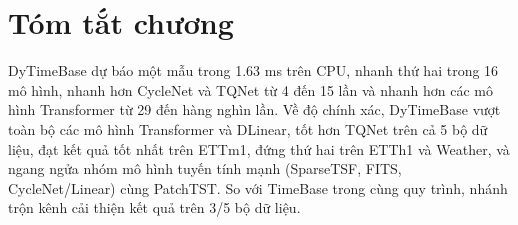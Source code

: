 \documentclass[12pt,a4paper]{report}
\numberwithin{equation}{chapter}
\begin{document}
\section*{Tóm tắt chương}

DyTimeBase dự báo một mẫu trong 1.63 ms trên CPU, nhanh thứ hai trong 16 mô hình, nhanh hơn CycleNet và TQNet từ 4 đến
15 lần và nhanh hơn các mô hình Transformer từ 29 đến hàng nghìn lần. Về độ
chính xác, DyTimeBase vượt toàn bộ các mô hình Transformer và DLinear, tốt hơn TQNet trên cả 5 bộ dữ liệu, đạt kết quả
tốt nhất trên ETTm1, đứng thứ hai trên ETTh1 và Weather, và ngang ngửa nhóm mô hình tuyến tính mạnh (SparseTSF, FITS,
CycleNet/Linear) cùng PatchTST. So với TimeBase trong cùng quy trình, nhánh trộn kênh cải thiện kết quả trên 3/5 bộ dữ liệu.

\end{document}
